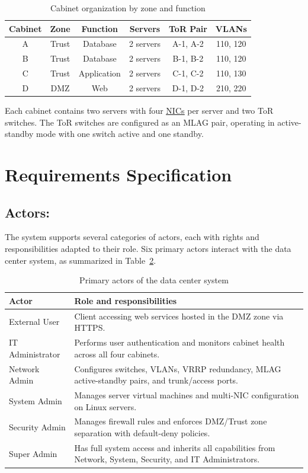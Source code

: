 \begin{table}[htbp]
    \centering
    \caption{Cabinet organization by zone and function}
    \label{tab:cabinets}
    \begin{tabular}{|c|c|c|c|c|c|}
        \hline
        \textbf{Cabinet} & \textbf{Zone} & \textbf{Function} & \textbf{Servers} & \textbf{ToR Pair} & \textbf{VLANs} \\
        \hline
        A & Trust & Database & 2 servers & A-1, A-2 & 110, 120 \\
        B & Trust & Database & 2 servers & B-1, B-2 & 110, 120 \\
        C & Trust & Application & 2 servers & C-1, C-2 & 110, 130 \\
        D & DMZ & Web & 2 servers & D-1, D-2 & 210, 220 \\
        \hline
    \end{tabular}
\end{table}
Each cabinet contains two servers with four \hyperref[def:nic]{\underline{NICs}} per server and two ToR switches. The ToR switches are configured as an MLAG pair, operating in active-standby mode with one switch active and one standby.
 \section{Requirements Specification}
 \subsection{Actors:}
The system supports several categories of actors, each with rights and responsibilities adapted to their role. Six primary actors interact with the data center system, as summarized in Table~\ref{tab:actors}.

\begin{table}[htbp]
    \centering
    \caption{Primary actors of the data center system}
    \label{tab:actors}
    \begin{tabular}{|l|p{}|}
        \hline
        \textbf{Actor} & \textbf{Role and responsibilities} \\
        \hline
        External User & Client accessing web services hosted in the DMZ zone via HTTPS. \\
        \hline
        IT Administrator & Performs user authentication and monitors cabinet health across all four cabinets. \\
        \hline
        Network Admin & Configures switches, VLANs, VRRP redundancy, MLAG active-standby pairs, and trunk/access ports. \\
        \hline
        System Admin & Manages server virtual machines and multi-NIC configuration on Linux servers. \\
        \hline
        Security Admin & Manages firewall rules and enforces DMZ/Trust zone separation with default-deny policies. \\
        \hline
        Super Admin & Has full system access and inherits all capabilities from Network, System, Security, and IT Administrators. \\
        \hline
    \end{tabular}
\end{table}
